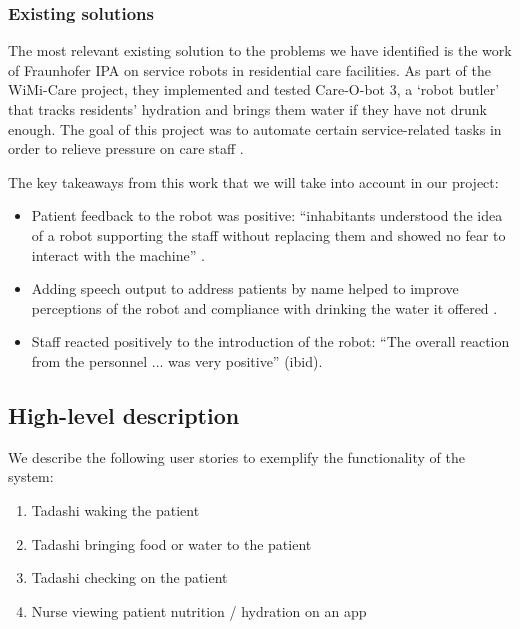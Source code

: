 \documentclass{article}
\begin{document}
\subsubsection{Existing solutions}
The most relevant existing solution to the problems we have identified is the work of Fraunhofer IPA on service robots in residential care facilities. As part of the WiMi-Care project, they implemented and tested Care-O-bot 3, a `robot butler' that tracks residents' hydration and brings them water if they have not drunk enough. The goal of this project was to automate certain service-related tasks in order to relieve pressure on care staff \cite{fraunhofer}.

The key takeaways from this work that we will take into account in our project:
\begin{itemize}
\item Patient feedback to the robot was positive: ``inhabitants  understood  the  idea  of  a  robot  supporting  the  staff  without replacing them and showed no fear to interact with the machine'' \cite{springer}. 
\item Adding speech output to address patients by name helped to improve perceptions of the robot and compliance with drinking the water it offered \cite{ieee}. 
\item Staff reacted positively to the introduction of the robot: ``The overall reaction from the personnel ... was very positive'' (ibid). 
\end{itemize}

\subsection{High-level description} 
We describe the following user stories to exemplify the functionality of the system: 
\begin{enumerate}
\item Tadashi waking the patient
\item Tadashi bringing food or water to the patient
\item Tadashi checking on the patient
\item Nurse viewing patient nutrition / hydration on an app
\end{enumerate}
\end{document}
